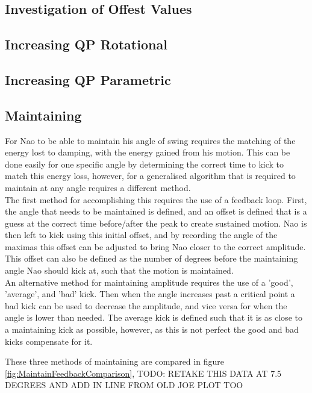 \documentclass[11pt]{article}
\newcommand*\ruleline[1]{\par\noindent\raisebox{.8ex}{\makebox[\linewidth]{\hrulefill\hspace{1ex}\raisebox{-.8ex}{#1}\hspace{1ex}\hrulefill}}}
\begin{document}
\subsection{Investigation of Offest Values}
\ruleline{David Thomas}

\subsection{Increasing QP Rotational}\label{sec:Increasing QP Rotational}
\subsection{Increasing QP Parametric}
\subsection{Maintaining}
\ruleline{George Sheppard}
For Nao to be able to maintain his angle of swing requires the matching of the energy lost to damping, with the energy gained from his motion. This can be done easily for one specific angle by determining the correct time to kick to match this energy loss, however, for a generalised algorithm that is required to maintain at any angle requires a different method.\\

The first method for accomplishing this requires the use of a feedback loop. First, the angle that needs to be maintained is defined, and an offset is defined that is a guess at the correct time before/after the peak to create sustained motion. Nao is then left to kick using this initial offset, and by recording the angle of the maximas this offset can be adjusted to bring Nao closer to the correct amplitude. This offset can also be defined as the number of degrees before the maintaining angle Nao should kick at, such that the motion is maintained.\\

An alternative method for maintaining amplitude requires the use of a 'good', 'average', and 'bad' kick. Then when the angle increases past a critical point a bad kick can be used to decrease the amplitude, and vice versa for when the angle is lower than needed. The average kick is defined such that it is as close to a maintaining kick as possible, however, as this is not perfect the good and bad kicks compensate for it.

These three methods of maintaining are compared in figure \ref{fig:MaintainFeedbackComparison}, TODO: RETAKE THIS DATA AT 7.5 DEGREES AND ADD IN LINE FROM OLD JOE PLOT TOO\\
\end{document}
